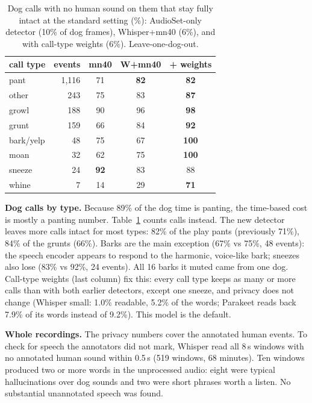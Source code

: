 \documentclass[10pt,twocolumn,a4paper]{article}
\begin{document}
\begin{table}[t]
\centering\small
\caption{Dog calls with no human sound on them that stay fully intact at the standard setting (\%):
AudioSet-only detector (10\% of dog frames), Whisper+mn40 (6\%), and with call-type weights (6\%).
Leave-one-dog-out.}
\label{tab:calls}
\begin{tabular}{@{}lrccc@{}}
\toprule
call type & events & mn40 & W+mn40 & + weights\\
\midrule
pant & 1{,}116 & 71 & \textbf{82} & \textbf{82}\\
other & 243 & 75 & 83 & \textbf{87}\\
growl & 188 & 90 & 96 & \textbf{98}\\
grunt & 159 & 66 & 84 & \textbf{92}\\
bark/yelp & 48 & 75 & 67 & \textbf{100}\\
moan & 32 & 62 & 75 & \textbf{100}\\
sneeze & 24 & \textbf{92} & 83 & 88\\
whine & 7 & 14 & 29 & \textbf{71}\\
\bottomrule
\end{tabular}
\end{table}

\textbf{Dog calls by type.} Because 89\% of the dog time is panting, the time-based cost is mostly a
panting number. Table~\ref{tab:calls} counts calls instead. The new detector leaves more calls intact
for most types: 82\% of the play pants (previously 71\%), 84\% of the grunts (66\%). Barks are the main
exception (67\% vs 75\%, 48 events): the speech encoder appears to respond to the harmonic, voice-like
bark; sneezes also lose (83\% vs 92\%, 24 events). All 16 barks it muted came from one dog.
Call-type weights (last column) fix this: every call type keeps as many or more calls than with both
earlier detectors, except one sneeze, and privacy does not change (Whisper small: 1.0\% readable, 5.2\%
of the words; Parakeet reads back 7.9\% of its words instead of 9.2\%). This model is the default.

\textbf{Whole recordings.} The privacy numbers cover the annotated human events. To check for speech
the annotators did not mark, Whisper read all 8\,s windows with no annotated human sound within 0.5\,s
(519 windows, 68 minutes). Ten windows produced two or more words in the unprocessed audio: eight were
typical hallucinations over dog sounds and two were short phrases worth a listen. No substantial
unannotated speech was found.
\end{document}

